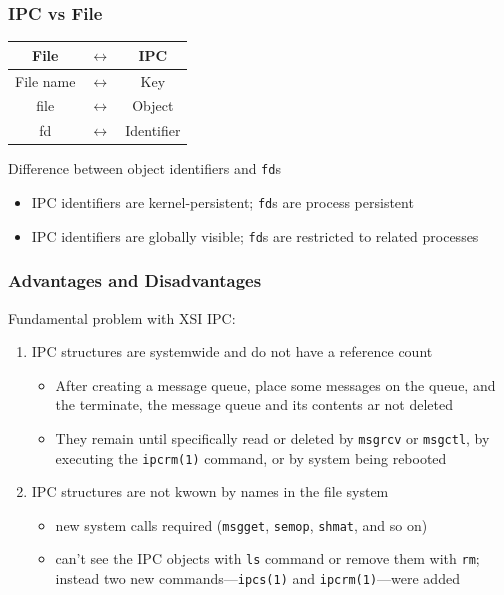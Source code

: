 \documentclass[newPxFont,sthlmFooter,nooffset]{beamer}
\begin{document}
\begin{frame}[t]
  \frametitle{IPC vs File}
  \begin{table}[h]
    \centering
    \begin{tabular}{c c c }
      File & $\longleftrightarrow$ & IPC \\ \hline
      File name & $\longleftrightarrow$ & Key \\
      file & $\longleftrightarrow$ & Object \\
      fd   & $\longleftrightarrow$ & Identifier
    \end{tabular}
  \end{table}

Difference between object identifiers and \texttt{fd}s
  \begin{itemize}
  \item IPC identifiers are kernel-persistent; \texttt{fd}s are process persistent
  \item IPC identifiers are globally visible; \texttt{fd}s are restricted to related processes
  \end{itemize}

\end{frame}


\begin{frame}[t]
  \frametitle{Advantages and Disadvantages}
Fundamental problem with XSI IPC: 
  \begin{enumerate}
  \item IPC structures are systemwide and do not have a reference count
{\footnotesize
    \begin{itemize}
    \item After creating a message queue, place some messages on the queue, and the terminate, the message queue and its contents ar not deleted
    \item They remain until specifically read or deleted by \texttt{msgrcv} or \texttt{msgctl}, by executing the \texttt{ipcrm(1)} command, or by system being rebooted
    \end{itemize}
}
\item IPC structures are not kwown by names in the file system
{\footnotesize
  \begin{itemize}
  \item new system calls required (\texttt{msgget}, \texttt{semop}, \texttt{shmat}, and so on)
  \item can't see the IPC objects with \texttt{ls} command or remove them with \texttt{rm}; instead two new commands---\texttt{ipcs(1)} and \texttt{ipcrm(1)}---were added
  \end{itemize}
}
  \end{enumerate}

\end{frame}
\end{document}
